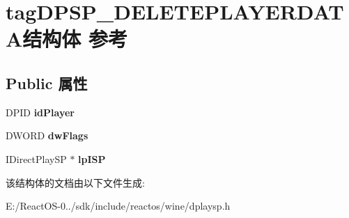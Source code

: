 \hypertarget{structtag_d_p_s_p___d_e_l_e_t_e_p_l_a_y_e_r_d_a_t_a}{}\section{tag\+D\+P\+S\+P\+\_\+\+D\+E\+L\+E\+T\+E\+P\+L\+A\+Y\+E\+R\+D\+A\+T\+A结构体 参考}
\label{structtag_d_p_s_p___d_e_l_e_t_e_p_l_a_y_e_r_d_a_t_a}
\subsection*{Public 属性}
\begin{DoxyCompactItemize}
\item 
\mbox{\label{structtag_d_p_s_p___d_e_l_e_t_e_p_l_a_y_e_r_d_a_t_a_a4975192e2a5c85dfcb219610b0ae28b0}} 
D\+P\+ID {\bfseries id\+Player}
\item 
\mbox{\label{structtag_d_p_s_p___d_e_l_e_t_e_p_l_a_y_e_r_d_a_t_a_a94f64bc2391db0e1d35d169223561276}} 
D\+W\+O\+RD {\bfseries dw\+Flags}
\item 
\mbox{\label{structtag_d_p_s_p___d_e_l_e_t_e_p_l_a_y_e_r_d_a_t_a_a5e813b103293e7ec610cdeb37dabd74f}} 
I\+Direct\+Play\+SP $\ast$ {\bfseries lp\+I\+SP}
\end{DoxyCompactItemize}


该结构体的文档由以下文件生成\+:\begin{DoxyCompactItemize}
\item 
E\+:/\+React\+O\+S-\/0../sdk/include/reactos/wine/dplaysp.\+h\end{DoxyCompactItemize}

